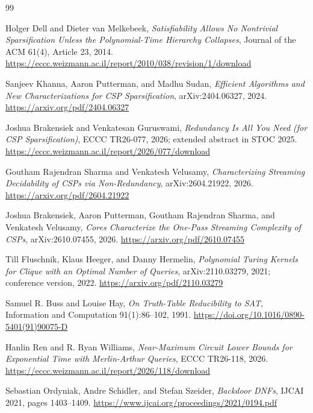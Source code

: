 \documentclass[11pt]{article}
\begin{document}
\begin{thebibliography}{99}

Holger Dell and Dieter van Melkebeek,
\emph{Satisfiability Allows No Nontrivial Sparsification Unless the
Polynomial-Time Hierarchy Collapses},
Journal of the ACM 61(4), Article 23, 2014.
\url{https://eccc.weizmann.ac.il/report/2010/038/revision/1/download}

Sanjeev Khanna, Aaron Putterman, and Madhu Sudan,
\emph{Efficient Algorithms and New Characterizations for CSP
Sparsification}, arXiv:2404.06327, 2024.
\url{https://arxiv.org/pdf/2404.06327}

Joshua Brakensiek and Venkatesan Guruswami,
\emph{Redundancy Is All You Need (for CSP Sparsification)},
ECCC TR26-077, 2026; extended abstract in STOC 2025.
\url{https://eccc.weizmann.ac.il/report/2026/077/download}

Goutham Rajendran Sharma and Venkatesh Velusamy,
\emph{Characterizing Streaming Decidability of CSPs via Non-Redundancy},
arXiv:2604.21922, 2026.
\url{https://arxiv.org/pdf/2604.21922}

Joshua Brakensiek, Aaron Putterman, Goutham Rajendran Sharma, and
Venkatesh Velusamy,
\emph{Cores Characterize the One-Pass Streaming Complexity of CSPs},
arXiv:2610.07455, 2026.
\url{https://arxiv.org/pdf/2610.07455}

Till Fluschnik, Klaus Heeger, and Danny Hermelin,
\emph{Polynomial Turing Kernels for Clique with an Optimal Number of
Queries}, arXiv:2110.03279, 2021; conference version, 2022.
\url{https://arxiv.org/pdf/2110.03279}

Samuel R. Buss and Louise Hay,
\emph{On Truth-Table Reducibility to SAT},
Information and Computation 91(1):86--102, 1991.
\url{https://doi.org/10.1016/0890-5401(91)90075-D}

Hanlin Ren and R. Ryan Williams,
\emph{Near-Maximum Circuit Lower Bounds for Exponential Time with
Merlin-Arthur Queries}, ECCC TR26-118, 2026.
\url{https://eccc.weizmann.ac.il/report/2026/118/download}

Sebastian Ordyniak, Andre Schidler, and Stefan Szeider,
\emph{Backdoor DNFs}, IJCAI 2021, pages 1403--1409.
\url{https://www.ijcai.org/proceedings/2021/0194.pdf}


\end{thebibliography}
\end{document}
